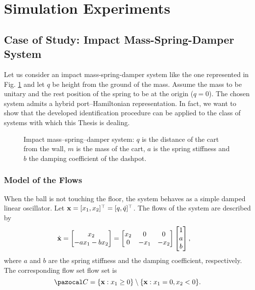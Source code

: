 \clearpage
\section{Simulation Experiments}\label{Experiments}
\subsection{Case of Study: Impact Mass-Spring-Damper System}
Let us consider an impact mass-spring-damper system like the one represented in Fig. \ref{fig:imsd} and let $q$ be height from the ground of the mass. Assume the mass to be unitary and the rest position of the spring to be at the origin ($q=0$). The chosen system admits a hybrid port--Hamiltonian representation. In fact, we want to show that the developed identification procedure can be applied to the class of systems with which this Thesis is dealing.
%
\begin{figure}[!ht]
	\centering
	
    \caption[Impact mass--spring--damper system.]{Impact mass--spring--damper system: $q$ is the distance of the cart from the wall, $m$ is the mass of the cart, $a$ is the spring stiffness and $b$ the damping coefficient of the dashpot.} 
    \label{fig:imsd}
\end{figure}
%
\subsubsection{Model of the Flows}
%
When the ball is not touching the floor, the system behaves as a simple damped linear oscillator. Let $\mathbf{x} = [x_1,x_2]^\top = [q,\dot{q}]^\top$. The flows of the system are described by 
\begin{align}
	\dot{\mathbf{x}}&=\begin{bmatrix}x_2\\-ax_1-bx_2\end{bmatrix}
	=\begin{bmatrix}x_2&0&0\\0&-x_1&-x_2\end{bmatrix}\begin{bmatrix}1\\a\\b\end{bmatrix},
\end{align}
%
{where $a$ and $b$ are the spring stiffness and the damping coefficient, respectively}. The corresponding flow set flow set is
%
\begin{equation}
    \C = \{\x:x_1\geq0\}\setminus\{\x:x_1=0,x_2<0\}.
\end{equation}
%
